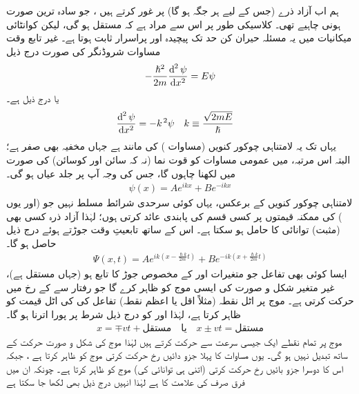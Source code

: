 ہم اب آزاد ذرے  (جس کے لیے ہر جگہ  ہو گا)  پر غور کرتے ہیں ، جو سادہ ترین صورت ہونی چاہیے تھی۔ کلاسیکی طور پر اس سے مراد ہے کہ     مستقل ہو گی، لیکن کوانٹائی میکانیات میں یہ مسئلہ حیران کن حد تک پیچیدہ اور پراسرار ثابت ہوتا ہے۔ غیر تابع وقت مساوات شروڈنگر   کی صورت درج ذیل 
\begin{align}\label{مساوات_شروڈنگر_آزاد_ذرہ_الف}
-\frac{\hslash^{2}}{2m}\frac{\dif^{\,2}{\psi}}{\dif{x^{2}}}=E\psi
\end{align}
یا  درج ذیل ہے۔
\begin{align}
\frac{\dif^{\,2}{\psi}}{\dif{x^{2}}}&=-k^{\,2}\psi&& k\equiv\frac{\sqrt{2mE}}{\hslash}
\end{align}
یہاں تک یہ لامتناہی چوکور کنویں (مساوات )  کی مانند ہے جہاں   مخفیہ   بھی صفر ہے؛ البتہ اس مرتبہ، میں عمومی مساوات کو قوت نما (نہ کہ سائن اور کوسائن)  کی صورت میں لكهنا چاہوں گا، جس کی وجہ آپ پر جلد عیاں ہو گی۔
\begin{align}
\psi(x)=Ae^{ikx}+Be^{-ikx}
\end{align}
لامتناہی چوکور کنویں کے برعکس، یہاں کوئی سرحدی شرائط مسلط  نہیں   جو  (اور یوں ) کی ممکنہ قیمتوں پر کسی قسم کی پابندی عائد کرتی ہوں؛ لہٰذا آزاد ذرہ کسی بھی (مثبت) توانائی کا حامل ہو سکتا ہے۔ اس کے ساتھ تابعیتِ وقت  جوڑتے ہوئے  درج ذیل حاصل ہو گا۔
\begin{align}\label{مساوات_شروڈنگر_آزاد_ذرہ_حرکت}
\Psi(x,t)=Ae^{ik(x-\frac{\hslash k}{2m}t)}+Be^{-ik(x+\frac{\hslash k}{2m}t)}
\end{align}
ایسا کوئی بھی تفاعل جو متغیرات   اور     کے مخصوص جوڑ  کا تابع ہو (جہاں  مستقل ہے)، 
 غیر  متغیر شکل و صورت کی ایسی موج کو ظاہر کرے گا جو  رفتار     سے   کے رخ   میں حرکت کرتی ہے۔  موج پر   اٹل نقطہ (مثلاً اقل  یا  اعظم     نقطہ)   تفاعل کی   کی  اٹل قیمت کو ظاہر   کرتا ہے، لہٰذا   اور   کو  درج ذیل  شرط پر پورا اترنا ہو گا۔
\begin{align*}
x=\mp vt+\text{مستقل}\quad \text{یا}\quad x\pm vt=\text{مستقل}
\end{align*}
موج پر تمام نقطے  ایک   جیسی سرعت سے حرکت کرتے ہیں لہٰذا موج کی شکل و صورت حرکت کے ساتھ تبدیل نہیں ہو گی۔ یوں مساوات   کا پہلا جزو دائیں رخ حرکت کرتی موج کو ظاہر کرتا ہے ، جبکہ اس کا دوسرا جزو بائیں رخ حرکت کرتی (اتنی ہی توانائی کی) موج کو ظاہر کرتا ہے۔ چونکہ ان میں فرق صرف  کی علامت کا ہے لہٰذا انہیں درج ذیل بھی لکھا جا سکتا ہے 
